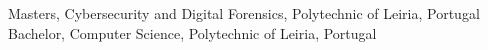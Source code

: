 %
%
%

\vspace{-1em}
\vspace{0.5em}
\begin{scholarship}
	{Masters, Cybersecurity and Digital Forensics, Polytechnic of Leiria, Portugal}
	{Bachelor, Computer Science, Polytechnic of Leiria, Portugal}
\end{scholarship}